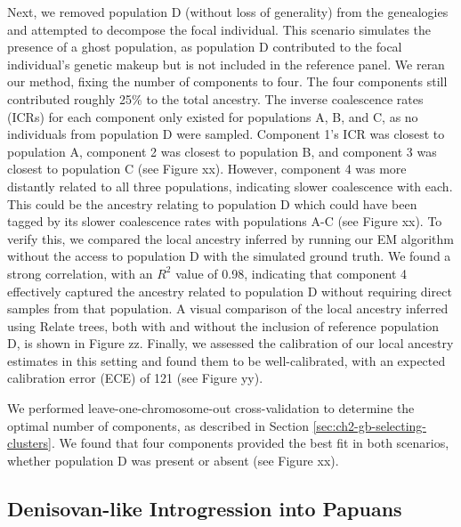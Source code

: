 Next, we removed population D (without loss of generality) from the genealogies and attempted to decompose the focal individual. This scenario simulates the presence of a ghost population, as population D contributed to the focal individual's genetic makeup but is not included in the reference panel. We reran our method, fixing the number of components to four. The four components still contributed roughly 25\% to the total ancestry. The inverse coalescence rates (ICRs) for each component only existed for populations A, B, and C, as no individuals from population D were sampled. Component 1's ICR was closest to population A, component 2 was closest to population B, and component 3 was closest to population C (see Figure xx). However, component 4 was more distantly related to all three populations, indicating slower coalescence with each. This could be the ancestry relating to population D which could have been tagged by its slower coalescence rates with populations A-C (see Figure xx). To verify this, we compared the local ancestry inferred by running our EM algorithm without the access to population D with the simulated ground truth. We found a strong correlation, with an $R^2$ value of 0.98, indicating that component 4 effectively captured the ancestry related to population D without requiring direct samples from that population. A visual comparison of the local ancestry inferred using Relate trees, both with and without the inclusion of reference population D, is shown in Figure zz. Finally, we assessed the calibration of our local ancestry estimates in this setting and found them to be well-calibrated, with an expected calibration error (ECE) of 121 (see Figure yy).


We performed leave-one-chromosome-out cross-validation to determine the optimal number of components, as described in Section \ref{sec:ch2-gb-selecting-clusters}. We found that four components provided the best fit in both scenarios, whether population D was present or absent (see Figure xx).

\subsection{Denisovan-like Introgression into Papuans}


